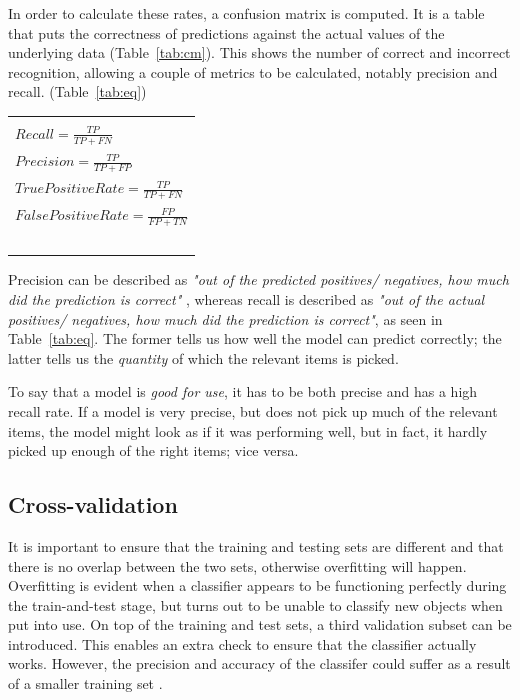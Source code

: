 \documentclass[11pt,openright,a4paper]{report}
\begin{document}
In order to calculate these rates, a confusion matrix is computed. It is a table that puts the correctness of predictions against the actual values of the underlying data (Table~\ref{tab:cm}). This shows the number of correct and incorrect recognition, allowing a couple of metrics to be calculated, notably precision and recall. (Table~\ref{tab:eq}) 

\parbox{\linewidth} {
  \centering
  \begin{tabular}{|l|}
    \hline \\
    \( Recall              = \frac{TP}{TP + FN} \) \\[10pt]
    \( Precision           = \frac{TP}{TP + FP} \) \\[10pt]
    \( True Positive Rate  = \frac{TP}{TP + FN} \) \\[10pt]
    \( False Positive Rate = \frac{FP}{FP + TN} \) \\~\\
    \hline
  \end{tabular}
  
  \label{tab:eq}
}

Precision can be described as \textit{"out of the predicted positives/ negatives, how much did the prediction is correct" }, whereas recall is described as \textit{"out of the actual positives/ negatives, how much did the prediction is correct"}, as seen in Table~\ref{tab:eq}. The former tells us how well the model can predict correctly; the latter tells us the \textit{quantity} of which the relevant items is picked.~\cite{precision-recall-wiki}

To say that a model is \textit{good for use}, it has to be both precise and has a high recall rate. If a model is very precise, but does not pick up much of the relevant items, the model might look as if it was performing well, but in fact, it hardly picked up enough of the right items; vice versa.

\subsection{Cross-validation}
It is important to ensure that the training and testing sets are different and that there is no overlap between the two sets, otherwise overfitting will happen. Overfitting is evident when a classifier appears to be functioning perfectly during the train-and-test stage, but turns out to be unable to classify new objects when put into use. On top of the training and test sets, a third validation subset can be introduced. This enables an extra check to ensure that the classifier actually works.  However, the precision and accuracy of the classifer could suffer as a result of a smaller training set \cite{cross-val-scikit}. 
\end{document}
